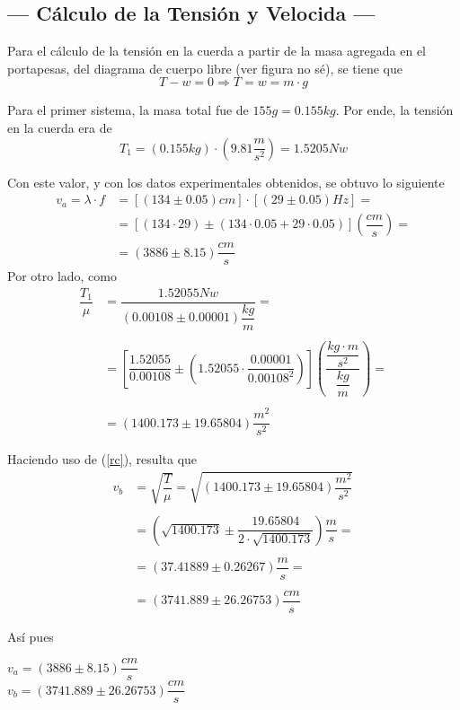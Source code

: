 \documentclass[a4paper, 10pt]{article}
\begin{document}
	
	\subsection{--- Cálculo de la Tensión y Velocida ---}
	
	Para el cálculo de la tensión en la cuerda a partir de la masa agregada en el portapesas, del diagrama de cuerpo libre (ver figura no sé), se tiene que $$ T-w=0\Longrightarrow T=w=m\cdot g$$
	
 	Para el primer sistema, la masa total fue de $ 155 g=0.155 kg $. Por ende, la tensión en la cuerda era de 
 	$$T_1=(0.155 kg)\cdot \left(9.81\frac{m}{s^2}\right)=1.5205 Nw$$
 	
 	Con este valor, y con los datos experimentales obtenidos, se obtuvo lo siguiente
 	\begin{align*}
 		v_a=\lambda\cdot f&=[(134\pm0.05)cm]\cdot[(29\pm 0.05)Hz]=\\
 		&=[(134\cdot29)\pm(134\cdot0.05+ 29\cdot0.05)]\left(\dfrac{cm}{s}\right)=\\
 		&=(3886\pm8.15)\dfrac{cm}{s}
 	\end{align*}
 	Por otro lado, como
 	\begin{align*}
 		\dfrac{T_1}{\mu}&=\dfrac{1.52055 Nw}{(0.00108\pm 0.00001)\dfrac{kg}{m}}=\\\\
 		&=\left[\dfrac{1.52055}{0.00108}\pm\left(1.52055\cdot\dfrac{0.00001}{0.00108^2}\right)\right]\left(\dfrac{\dfrac{kg\cdot m}{s^2}}{\dfrac{kg}{m}}\right)=\\\\
 		&=(1400.173\pm19.65804)\dfrac{m^2}{s^2}
 	\end{align*}
 	
 	Haciendo uso de (\ref{rc}), resulta que
 	\begin{align*}
 		v_b&=\sqrt{\dfrac{T}{\mu}}=\sqrt{(1400.173\pm19.65804)\dfrac{m^2}{s^2}}\\\\
 		&=\left(\sqrt{1400.173}\pm\dfrac{19.65804}{2\cdot\sqrt{1400.173}}\right)\dfrac{m}{s}=\\\\
 		&=(37.41889\pm 0.26267)\dfrac{m}{s}=\\\\
 		&=(3741.889\pm 26.26753)\dfrac{cm}{s}
 	\end{align*}
 
 	Así pues
 	\begin{center}
 		\begin{multicols}{2}
	 		$ v_a=(3886\pm8.15)\dfrac{cm}{s} $\\
	 		$ v_b=(3741.889\pm 26.26753)\dfrac{cm}{s} $
	 	\end{multicols}
 	\end{center}
 	
\end{document}
